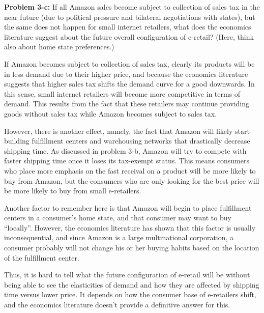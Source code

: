 \documentclass[psamsfonts]{amsart}
\newenvironment{sol}{\vspace{0.25cm}{\large \bfseries Solution:}}{\qedsymbol}
\newenvironment{prob}[1]{\begin{framed}{\large \bfseries Problem #1:}}{\end{framed}}
\begin{document}
\begin{prob}{3-c}
If all Amazon sales become subject to collection of sales tax in the near future (due to political pressure and bilateral negotiations with states), but the same does not happen for small internet retailers, what does the economics literature suggest about the future overall configuration of e-retail? (Here, think also about home state preferences.)
\end{prob}
\begin{sol}
If Amazon becomes subject to collection of sales tax, clearly its products will be in less demand due to their higher price, and because the economics literature suggests that higher sales tax shifts the demand curve for a good downwards. In this sense, small internet retailers will become more competitive in terms of demand. This results from the fact that these retailers may continue providing goods without sales tax while Amazon becomes subject to sales tax.

However, there is another effect, namely, the fact that Amazon will likely start building fulfillment centers and warehousing networks that drastically decrease shipping time. As discussed in problem 3-b, Amazon will try to compete with faster shipping time once it loses its tax-exempt status. This means consumers who place more emphasis on the fast receival on a product will be more likely to buy from Amazon, but the consumers who are only looking for the best price will be more likely to buy from small e-retailers. 

Another factor to remember here is that Amazon will begin to place fulfillment centers in a consumer's home state, and that consumer may want to buy ``locally''. However, the economics literature has shown that this factor is usually inconsequential, and since Amazon is a large multinational corporation, a consumer probably will not change his or her buying habits based on the location of the fulfillment center. 

Thus, it is hard to tell what the future configuration of e-retail will be without being able to see the elasticities of demand and how they are affected by shipping time versus lower price. It depends on how the consumer base of e-retailers shift, and the economics literature doesn't provide a definitive answer for this.
\end{sol}
\end{document}
